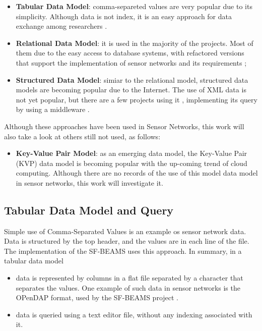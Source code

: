 \begin{itemize}
  \item \textbf{Tabular Data Model}: comma-separeted values are very popular
  due to its simplicity. Although data is not index, it is an easy approach for data
 exchange among researchers \cite{sn-provenance}.
  \item \textbf{Relational Data Model}: it is used in the majority of the
  projects. Most of them due to the easy access to database systems, with
  refactored versions that support the implementation of sensor networks and
  its requirements \cite{sn-db-tinydb};
  \item \textbf{Structured Data Model}: simiar to the relational model,
  structured data models are becoming popular due to the Internet. The use of
  XML data \cite{xml} is not yet popular, but there are a few projects using it
  \cite{sn-xml-usage01}\cite{sn-xml-usage01}, implementing its query by using a
  middleware \cite{sn-xml-middleware} \cite{sn-xml-query-engines}.
\end{itemize}

Although these approaches have been used in Sensor Networks, this work will
also take a look at others still not used, as follows:

\begin{itemize}
  \item \textbf{Key-Value Pair Model}: as an emerging data model, the Key-Value
  Pair (KVP) \cite{db-kvp} data model is becoming popular with the up-coming
  trend of cloud computing. Although there are no records of the use of this
  model data model in sensor networks, this work will investigate it.
\end{itemize}

\subsection{Tabular Data Model and Query}

Simple use of Comma-Separated Values is an example os sensor network data. Data
is structured by the top header, and the values are in each line of the file.
The implementation of the SF-BEAMS \cite{sfbeams2006} uses this approach. In
summary, in a tabular data model

\begin{itemize}
  \item data is represented by columns in a flat file separated by a character
  that separates the values. One example of such data in sensor networks is the
  OPenDAP \cite{opendap} format, used by the SF-BEAMS project
  \cite{sfbeams2006}.
  \item data is queried using a text editor file, without any indexing
  associated with it. 
\end{itemize}


